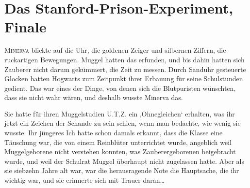 \chapter{Das Stanford-Prison-Experiment, Finale}

\lettrine{M}{inerva} blickte auf die Uhr, die goldenen Zeiger und silbernen Ziffern, die ruckartigen Bewegungen. Muggel hatten das erfunden, und bis dahin hatten sich Zauberer nicht darum gekümmert, die Zeit zu messen. Durch Sanduhr gesteuerte Glocken hatten Hogwarts zum Zeitpunkt ihrer Erbauung für seine Schulstunden gedient. Das war eines der Dinge, von denen sich die Blutpuristen wünschten, dass sie nicht wahr wären, und deshalb wusste Minerva das.

Sie hatte für ihren Muggelstudien U.T.Z. ein ‚Ohnegleichen‘ erhalten, was ihr jetzt ein Zeichen der Schande zu sein schien, wenn man bedachte, wie wenig sie wusste.%
Ihr jüngeres Ich hatte schon damals erkannt, dass die Klasse eine Täuschung war, die von einem Reinblüter unterrichtet wurde, angeblich weil Muggelgeborene nicht verstehen konnten, was Zauberergeborenen beigebracht wurde, und weil der Schulrat Muggel überhaupt nicht zugelassen hatte. Aber als sie siebzehn Jahre alt war, war die herausragende Note die Hauptsache, die ihr wichtig war, und sie erinnerte sich mit Trauer daran…

